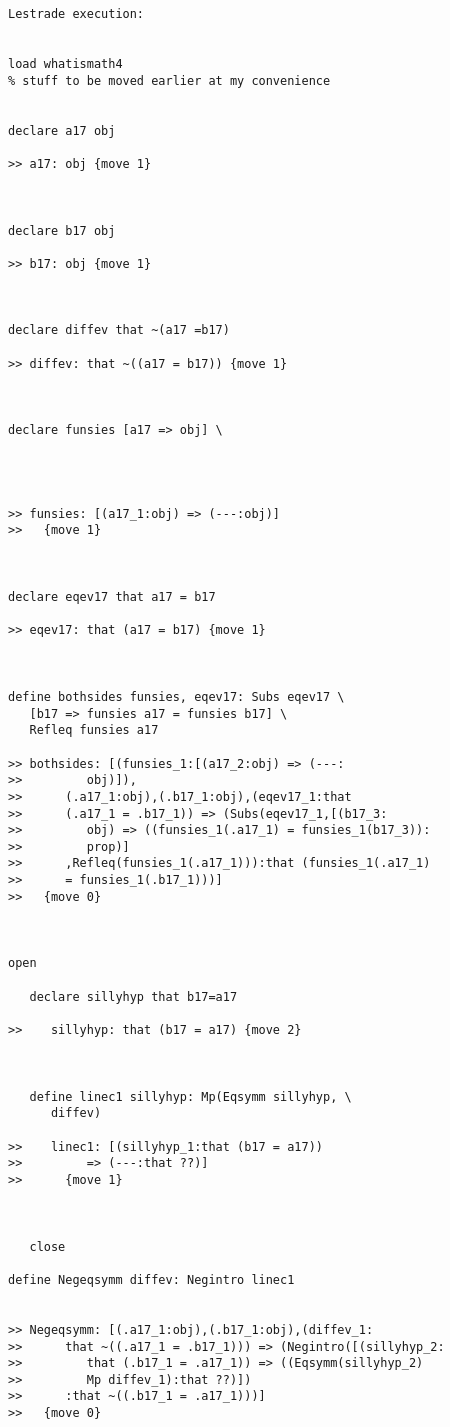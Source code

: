 \documentclass[12pt]{article}
\begin{document}
\begin{verbatim}Lestrade execution:


load whatismath4
% stuff to be moved earlier at my convenience


declare a17 obj

>> a17: obj {move 1}



declare b17 obj

>> b17: obj {move 1}



declare diffev that ~(a17 =b17)

>> diffev: that ~((a17 = b17)) {move 1}



declare funsies [a17 => obj] \
   



>> funsies: [(a17_1:obj) => (---:obj)]
>>   {move 1}



declare eqev17 that a17 = b17

>> eqev17: that (a17 = b17) {move 1}



define bothsides funsies, eqev17: Subs eqev17 \
   [b17 => funsies a17 = funsies b17] \
   Refleq funsies a17

>> bothsides: [(funsies_1:[(a17_2:obj) => (---:
>>         obj)]),
>>      (.a17_1:obj),(.b17_1:obj),(eqev17_1:that
>>      (.a17_1 = .b17_1)) => (Subs(eqev17_1,[(b17_3:
>>         obj) => ((funsies_1(.a17_1) = funsies_1(b17_3)):
>>         prop)]
>>      ,Refleq(funsies_1(.a17_1))):that (funsies_1(.a17_1)
>>      = funsies_1(.b17_1)))]
>>   {move 0}



open

   declare sillyhyp that b17=a17

>>    sillyhyp: that (b17 = a17) {move 2}



   define linec1 sillyhyp: Mp(Eqsymm sillyhyp, \
      diffev)

>>    linec1: [(sillyhyp_1:that (b17 = a17))
>>         => (---:that ??)]
>>      {move 1}



   close

define Negeqsymm diffev: Negintro linec1


>> Negeqsymm: [(.a17_1:obj),(.b17_1:obj),(diffev_1:
>>      that ~((.a17_1 = .b17_1))) => (Negintro([(sillyhyp_2:
>>         that (.b17_1 = .a17_1)) => ((Eqsymm(sillyhyp_2)
>>         Mp diffev_1):that ??)])
>>      :that ~((.b17_1 = .a17_1)))]
>>   {move 0}




\end{verbatim}
\end{document}
